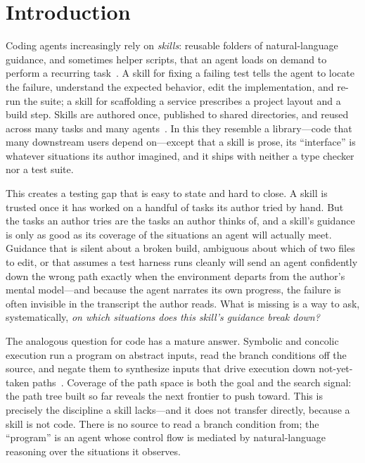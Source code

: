 \documentclass[acmsmall,screen,review,anonymous]{acmart}
\begin{document}
\maketitle

\section{Introduction}
\label{sec:intro}

Coding agents increasingly rely on \emph{skills}: reusable folders of natural-language
guidance, and sometimes helper scripts, that an agent loads on demand to perform a
recurring task~\cite{anthropic2025skills,anthropic2025skillseng}. A skill for fixing
a failing test tells the agent to locate the failure, understand the expected
behavior, edit the implementation, and re-run the suite; a skill for scaffolding a
service prescribes a project layout and a build step. Skills are authored once,
published to shared directories, and reused across many tasks and many
agents~\cite{anthropic2025skillseng}. In this they resemble a library---code that
many downstream users depend on---except that a skill is prose, its ``interface'' is
whatever situations its author imagined, and it ships with neither a type checker nor
a test suite.

This creates a testing gap that is easy to state and hard to close. A skill is
trusted once it has worked on a handful of tasks its author tried by hand. But the
tasks an author tries are the tasks an author thinks of, and a skill's guidance is
only as good as its coverage of the situations an agent will actually meet. Guidance
that is silent about a broken build, ambiguous about which of two files to edit, or
that assumes a test harness runs cleanly will send an agent confidently down the
wrong path exactly when the environment departs from the author's mental model---and
because the agent narrates its own progress, the failure is often invisible in the
transcript the author reads. What is missing is a way to ask, systematically, \emph{on
which situations does this skill's guidance break down?}

The analogous question for code has a mature answer. Symbolic and concolic execution
run a program on abstract inputs, read the branch conditions off the source, and negate
them to synthesize inputs that drive execution down not-yet-taken
paths~\cite{king1976symbolic,dart,sen2005cute,klee}. Coverage of the path space is
both the goal and the search signal: the path tree built so far reveals the next
frontier to push toward. This is precisely the discipline a skill lacks---and it does
not transfer directly, because a skill is not code. There is no source to read a
branch condition from; the ``program'' is an agent whose control flow is mediated by
natural-language reasoning over the situations it observes.
\end{document}
